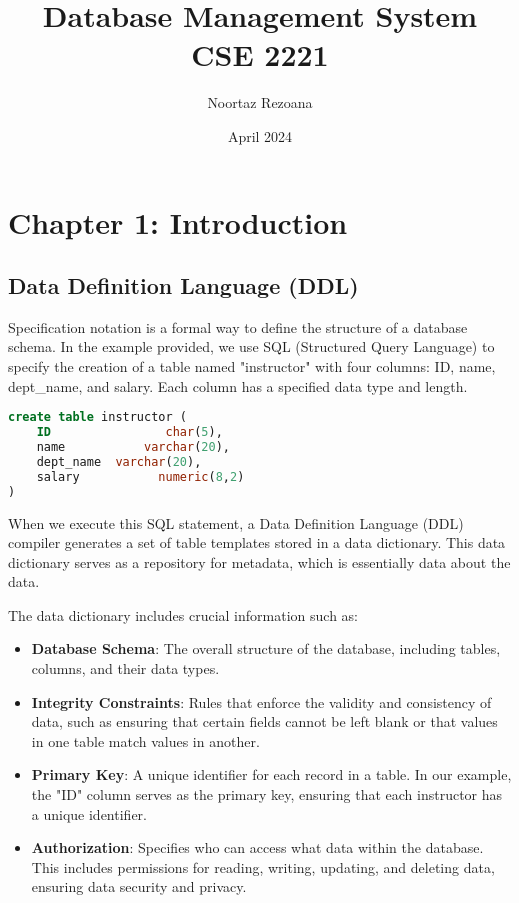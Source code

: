 \documentclass{article}
\title{Database Management System \\ CSE 2221}
\author{Noortaz Rezoana}
\date{April 2024}
\begin{document}
\maketitle

\newpage
\section*{Chapter 1: Introduction}

\subsection*{Data Definition Language (DDL)}

Specification notation is a formal way to define the structure of a database schema. In the example provided, we use SQL (Structured Query Language) to specify the creation of a table named "instructor" with four columns: ID, name, dept\_name, and salary. Each column has a specified data type and length.

\begin{lstlisting}[language=SQL]
create table instructor (
    ID                char(5),
    name           varchar(20),
    dept_name  varchar(20),
    salary           numeric(8,2)
)
\end{lstlisting}

When we execute this SQL statement, a Data Definition Language (DDL) compiler generates a set of table templates stored in a data dictionary. This data dictionary serves as a repository for metadata, which is essentially data about the data. 

The data dictionary includes crucial information such as:

\begin{itemize}
    \item \textbf{Database Schema}: The overall structure of the database, including tables, columns, and their data types.
    \item \textbf{Integrity Constraints}: Rules that enforce the validity and consistency of data, such as ensuring that certain fields cannot be left blank or that values in one table match values in another.
    \item \textbf{Primary Key}: A unique identifier for each record in a table. In our example, the "ID" column serves as the primary key, ensuring that each instructor has a unique identifier.
    \item \textbf{Authorization}: Specifies who can access what data within the database. This includes permissions for reading, writing, updating, and deleting data, ensuring data security and privacy.
\end{itemize}
\end{document}
